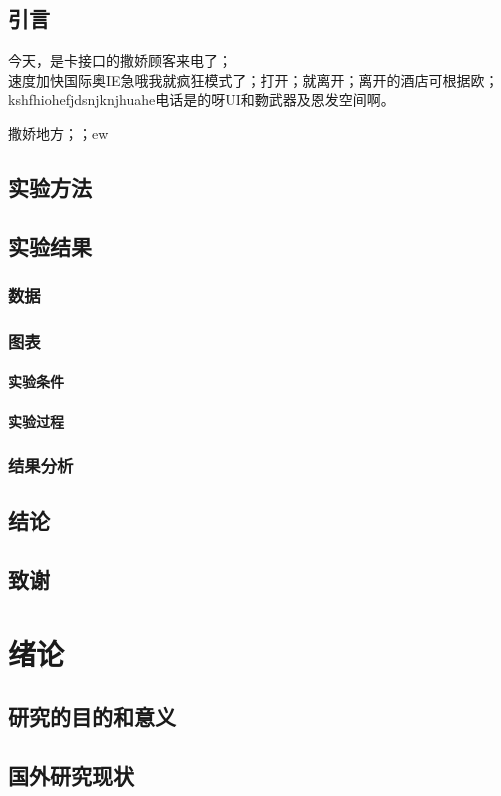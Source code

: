 \documentclass{ctexbook}%
\begin{document}
	\tableofcontents%
	\section{引言}%
	今天，是卡接口的撒娇顾客来电了；\\速度加快国际奥IE急哦我就疯狂模式了；打开；就离开；离开的酒店可根据欧；kshfhiohefjdsnjknjhuahe电话是的呀UI和覅武器及恩发空间啊。
	
	撒娇地方；；ew
	\section{实验方法}
	\section{实验结果}
	\subsection{数据}
	\subsection{图表}
	\subsubsection{实验条件}
	\subsubsection{实验过程}
	\subsection{结果分析}
	\section{结论}
	\section{致谢}
	\chapter{绪论}%
	\section{研究的目的和意义}
	\section{国外研究现状}
\end{document}
